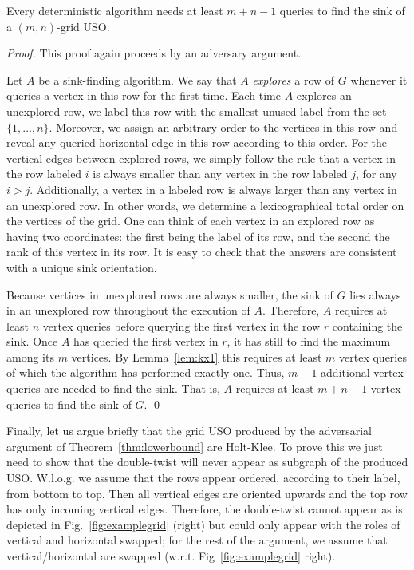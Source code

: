 \documentclass[runningheads,a4paper]{llncs}
\begin{document}
\begin{theorem} \label{thm:lowerbound}
Every deterministic algorithm needs at least $m+n-1$ queries to find the sink of a $(m,n)$-grid USO. 
\end{theorem}
\begin{proof}
    This proof again proceeds by an adversary argument.

Let $A$ be a sink-finding algorithm. We say that $A$ \emph{explores} a row of $G$ whenever it queries a vertex in this row for the first time.
Each time $A$ explores an unexplored row, we label this row with the smallest unused label from the set $\{1, \ldots, n\}$. Moreover, we assign an arbitrary order to the vertices in this row and reveal any queried horizontal edge in this row according to this order. For the vertical edges between explored rows, we simply follow the rule that a vertex in the row labeled $i$ is always smaller than any vertex in the row labeled $j$, for any $i > j$. Additionally, a vertex in a labeled row is always larger than any vertex in an unexplored row. In other words, we determine a lexicographical total order on the vertices of the grid. One can think of each vertex in an explored row as having two coordinates: the first being the label of its row, and the second the rank of this vertex in its row.
It is easy to check that the answers are consistent with a unique sink orientation.

Because vertices in unexplored rows are always smaller, the sink of $G$ lies always in an unexplored row throughout the execution of $A$. Therefore, $A$ requires at least $n$ vertex queries before querying the first vertex in the row $r$ containing the sink. Once $A$ has queried the first vertex in $r$, it has still to find the maximum among its $m$ vertices. 
By Lemma~\ref{lem:kx1} this requires at least $m$ vertex queries of which the algorithm has performed exactly one. Thus, $m-1$ additional vertex queries are needed to find the sink. That is, $A$ requires at least $m+n-1$ vertex queries to find the sink of $G$. \qed
\end{proof}

Finally, let us argue briefly that the grid USO produced by the adversarial argument of Theorem~\ref{thm:lowerbound} are Holt-Klee. 
To prove this we just need to show that the double-twist will never appear as subgraph of the produced USO.
W.l.o.g. we assume that the rows appear ordered, according to their label, from bottom to top. Then all vertical edges are oriented upwards and 
the top row has only incoming vertical edges.
Therefore, the double-twist cannot appear as is depicted in Fig.~\ref{fig:examplegrid} (right) but could only appear with 
the roles of vertical and horizontal swapped; for the rest of the argument, we assume that vertical/horizontal are swapped
(w.r.t. Fig~\ref{fig:examplegrid} right).
\end{document}
